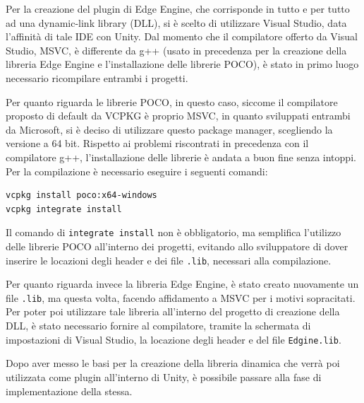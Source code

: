 Per la creazione del plugin di Edge Engine, che corrisponde in tutto e per tutto ad una dynamic-link library (DLL), si è scelto di utilizzare Visual Studio, data l'affinità di tale IDE con Unity. Dal momento che il compilatore offerto da Visual Studio, MSVC, è differente da g++ (usato in precedenza per la creazione della libreria Edge Engine e l’installazione delle librerie POCO), è stato in primo luogo necessario ricompilare entrambi i progetti.

Per quanto riguarda le librerie POCO, in questo caso, siccome il compilatore proposto di default da VCPKG è proprio MSVC, in quanto sviluppati entrambi da Microsoft, si è deciso di utilizzare questo package manager, scegliendo la versione a 64 bit. Rispetto ai problemi riscontrati in precedenza con il compilatore g++, l’installazione delle librerie è andata a buon fine senza intoppi. Per la compilazione è necessario eseguire i seguenti comandi:

\begin{verbatim}
vcpkg install poco:x64-windows
vcpkg integrate install
\end{verbatim}

Il comando di \texttt{integrate install} non è obbligatorio, ma semplifica l'utilizzo delle librerie POCO all'interno dei progetti, evitando allo sviluppatore di dover inserire le locazioni degli header e dei file \texttt{.lib}, necessari alla compilazione.

Per quanto riguarda invece la libreria Edge Engine, è stato creato nuovamente un file \texttt{.lib}, ma questa volta, facendo affidamento a MSVC per i motivi sopracitati. Per poter poi utilizzare tale libreria all'interno del progetto di creazione della DLL, è stato necessario fornire al compilatore, tramite la schermata di impostazioni di Visual Studio, la locazione degli header e del file \texttt{Edgine.lib}.

Dopo aver messo le basi per la creazione della libreria dinamica che verrà poi utilizzata come plugin all'interno di Unity, è possibile passare alla fase di implementazione della stessa.

